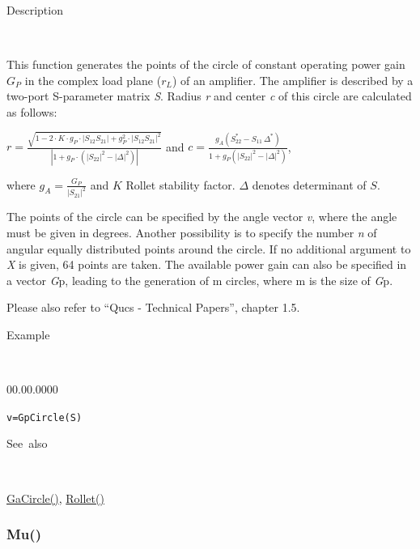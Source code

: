 \begin{description}
\item [Description]~
\end{description}
This function generates the points of the circle of constant operating
power gain $G_{P}$ in the complex load plane ($r_{L}$) of an amplifier.
The amplifier is described by a two-port S-parameter matrix \textit{S}.
Radius \textit{r} and center \textit{c} of this circle are calculated
as follows:

\medskip{}
\noindent $r={\displaystyle \frac{\sqrt{1-2\cdot K\cdot g_{P}\cdot\left|S_{12}S_{21}\right|+g_{P}^{2}\cdot\left|S_{12}S_{21}\right|^{2}}}{\left|1+g_{P}\cdot\left(\left|S_{22}\right|^{2}-\left|\Delta\right|^{2}\right)\right|}}$
and $c={\displaystyle \frac{g_{A}\left(S_{22}^{*}-S_{11}\,\Delta^{*}\right)}{1+g_{P}\left(\left|S_{22}\right|^{2}-\left|\Delta\right|^{2}\right)}}$,

\medskip{}
where $g_{A}={\displaystyle \frac{G_{P}}{\left|S_{21}\right|^{2}}}$
and $K$ Rollet stability factor. $\Delta$ denotes determinant of
$S$.
\medskip{}

\noindent The points of the circle can be specified by the angle vector
\textit{v}, where the angle must be given in degrees. Another possibility
is to specify the number \textit{n} of angular equally distributed
points around the circle. If no additional argument to \textit{X}
is given, 64 points are taken. The available power gain can also be
specified in a vector \textit{G}p, leading to the generation of m
circles, where m is the size of \textit{G}p.

\noindent Please also refer to {}``Qucs - Technical Papers'', chapter
1.5.

\begin{description}
\item [Example]~
\end{description}
\begin{lyxlist}{00.00.0000}
\item [\texttt{v=GpCircle(S)}]~
\end{lyxlist}
\begin{description}
\item [See~also]~
\end{description}
\textcolor{blue}{\hyperlink{GaCircle}{GaCircle()}}\textcolor{black}{,}
\textcolor{blue}{\hyperlink{Rollet}{Rollet()}}


\newpage
\subsubsection*{\hypertarget{Mu}{}{\Large Mu()}}


